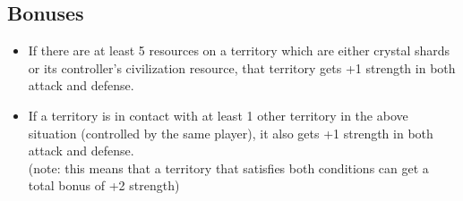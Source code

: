 \documentclass[a4paper]{article}
\begin{document}
    \subsection{Bonuses}
        \begin{itemize}
            \item If there are at least 5 resources on a territory which are either
                crystal shards or its controller's civilization resource,
                that territory gets +1 strength in both attack and defense.
            \item If a territory is in contact with at least 1 other territory
                in the above situation (controlled by the same player),
                it also gets +1 strength in both attack and defense.\\
                (note: this means that a territory that satisfies both conditions
                can get a total bonus of +2 strength)
        \end{itemize}
        
\end{document}
